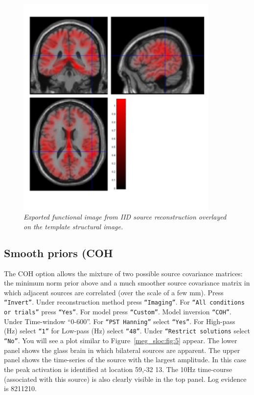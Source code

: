\begin{figure}
\begin{center}
\includegraphics[width=100mm]{meg_sloc/Slide4}
\caption{\em Exported functional image from IID source reconstruction overlayed on the template structural image.\label{meg_sloc:fig:4}}
\end{center}
\end{figure}

\subsection{Smooth priors (COH}
The COH option allows the mixture of two possible source covariance matrices: the minimum norm prior above and a much smoother source covariance matrix in which adjacent sources are correlated (over the scale of a few mm). Press \texttt{``Invert''}. Under reconstruction method press \texttt{``Imaging''}. For \texttt{``All conditions or trials''} press \texttt{``Yes''}. For model press \texttt{``Custom''}. Model inversion \texttt{``COH''}. Under Time-window ``0-600''. For \texttt{``PST Hanning''} select \texttt{``Yes''}. For High-pass (Hz) select \texttt{``1''} for Low-pass (Hz) select \texttt{``48''}. Under \texttt{``Restrict solutions} select \texttt{``No''}.   You will see a plot similar to Figure~\ref{meg_sloc:fig:5} appear. The lower panel shows the glass brain in which bilateral sources are apparent. The upper panel shows the time-series of the source with the largest amplitude. In this case the peak activation is identified at location 59,-32 13. The 10Hz time-course (associated with this source) is also clearly visible in the top panel.  Log evidence is 8211210.

